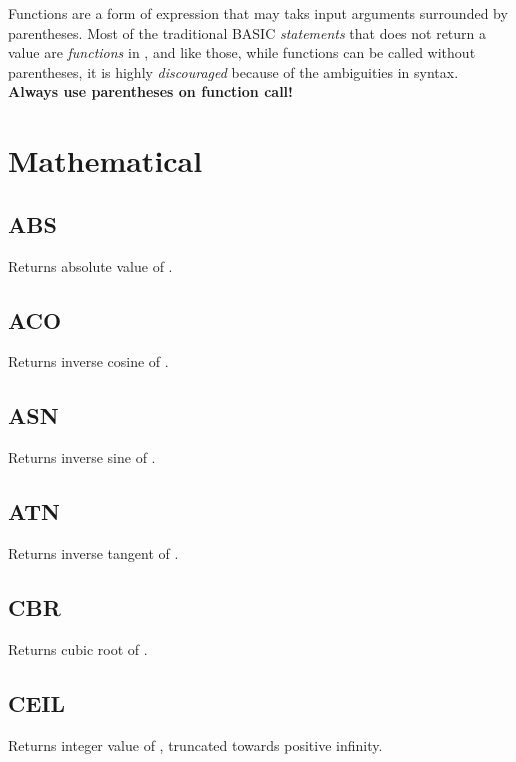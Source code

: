 \label{functions}

Functions are a form of expression that may taks input arguments surrounded by parentheses. Most of the traditional BASIC \emph{statements} that does not return a value are \emph{functions} in \tbas , and like those, while \tbas{} functions can be called without parentheses, it is highly \emph{discouraged} because of the ambiguities in syntax. \textbf{Always use parentheses on function call!}

\section{Mathematical}

    \subsection{ABS}
        \par
        Returns absolute value of .
    \subsection{ACO}
        \par
        Returns inverse cosine of .
    \subsection{ASN}
        \par
        Returns inverse sine of .
    \subsection{ATN}
        \par
        Returns inverse tangent of .
    \subsection{CBR}
        \par
        Returns cubic root of .
    \subsection{CEIL}
        \par
        Returns integer value of , truncated towards positive infinity.
